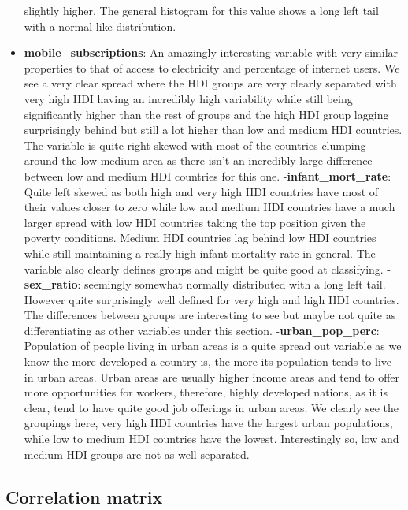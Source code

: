 \documentclass[]{article}
\begin{document}
\begin{itemize}
  slightly higher. The general histogram for this value shows a long
  left tail with a normal-like distribution.
\item
  \textbf{mobile\_subscriptions}: An amazingly interesting variable with
  very similar properties to that of access to electricity and
  percentage of internet users. We see a very clear spread where the HDI
  groups are very clearly separated with very high HDI having an
  incredibly high variability while still being significantly higher
  than the rest of groups and the high HDI group lagging surprisingly
  behind but still a lot higher than low and medium HDI countries. The
  variable is quite right-skewed with most of the countries clumping
  around the low-medium area as there isn't an incredibly large
  difference between low and medium HDI countries for this one.
  -\textbf{infant\_mort\_rate}: Quite left skewed as both high and very
  high HDI countries have most of their values closer to zero while low
  and medium HDI countries have a much larger spread with low HDI
  countries taking the top position given the poverty conditions. Medium
  HDI countries lag behind low HDI countries while still maintaining a
  really high infant mortality rate in general. The variable also
  clearly defines groups and might be quite good at classifying.
  -\textbf{sex\_ratio}: seemingly somewhat normally distributed with a
  long left tail. However quite surprisingly well defined for very high
  and high HDI countries. The differences between groups are interesting
  to see but maybe not quite as differentiating as other variables under
  this section. -\textbf{urban\_pop\_perc}: Population of people living
  in urban areas is a quite spread out variable as we know the more
  developed a country is, the more its population tends to live in urban
  areas. Urban areas are usually higher income areas and tend to offer
  more opportunities for workers, therefore, highly developed nations,
  as it is clear, tend to have quite good job offerings in urban areas.
  We clearly see the groupings here, very high HDI countries have the
  largest urban populations, while low to medium HDI countries have the
  lowest. Interestingly so, low and medium HDI groups are not as well
  separated.
\end{itemize}

\hypertarget{correlation-matrix}{%
\subsection{Correlation matrix}\label{correlation-matrix}}
\end{document}
